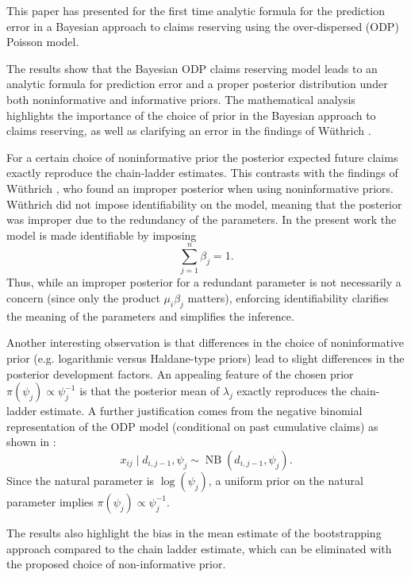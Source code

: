 \documentclass[aps,pre,draft]{revtex4-2}
\begin{document}
This paper has presented for the first time analytic formula for the prediction error in a Bayesian approach 
to claims reserving using the over-dispersed (ODP) Poisson model. 

The results show that the Bayesian ODP claims reserving model leads to an analytic formula for prediction error 
and a proper posterior distribution under both noninformative and informative priors. The mathematical analysis 
highlights the importance
of the choice of prior in the Bayesian approach to claims reserving, as well as clarifying an error in the findings of  W\"uthrich \cite{wuthrich2013challenges}.

For a certain choice of noninformative prior the posterior expected future claims exactly reproduce the chain-ladder 
estimates. This contrasts with the findings of W\"uthrich \cite{wuthrich2013challenges}, who 
found an improper posterior when using noninformative priors. W\"uthrich did not impose identifiability on the model, meaning that
the posterior was improper due to the redundancy of the parameters.
In the present work the model is made identifiable by imposing
\[
\sum_{j=1}^{n}\beta_j=1.
\]
Thus, while an improper posterior for a redundant parameter is not necessarily a concern 
(since only the product $\mu_i\beta_j$ matters), enforcing identifiability clarifies the meaning of the parameters and simplifies the inference.

Another interesting observation is that differences in the choice of noninformative prior (e.g. logarithmic versus 
Haldane-type priors) lead to slight differences in the posterior development factors. 
An appealing feature of the chosen prior $\pi(\psi_j)\propto\psi_j^{-1}$ is that the posterior mean of $\lambda_j$ exactly reproduces the chain-ladder estimate. A further justification comes from the negative binomial representation of the ODP model 
(conditional on past cumulative claims) as shown in \cite{verrall2000investigation}:
\begin{equation}\label{eq:nb}
x_{ij}\mid d_{i,j-1},\psi_j\sim \operatorname{NB}(d_{i,j-1},\psi_j).
\end{equation}
Since the natural parameter is $\log(\psi_j)$, a uniform prior on the natural parameter implies 
$\pi(\psi_j)\propto\psi_j^{-1}$.

The results also highlight the bias in the mean estimate of the bootstrapping approach compared to the chain ladder estimate, which
can be eliminated with the proposed choice of non-informative prior.
\end{document}
